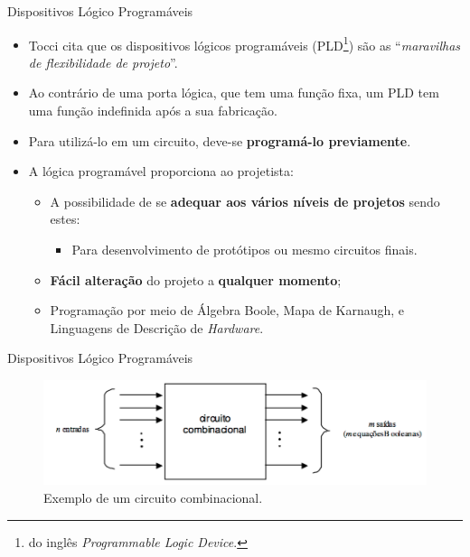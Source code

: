 \documentclass[aspectratio=169]{beamer}
\begin{document}
	\begin{frame}{Dispositivos Lógico Programáveis}
		\begin{itemize}
			\setlength\itemsep{1em}
			
			\item Tocci \cite{Tocci2003} cita que os dispositivos lógicos programáveis (PLD\footnote{do inglês \textit{Programmable Logic Device}.}) são as ``\textit{maravilhas de flexibilidade de projeto}''.
			
			\item Ao contrário de uma porta lógica, que tem uma função fixa, um PLD tem uma função indefinida após a sua fabricação. 
			
			\item Para utilizá-lo em um circuito, deve-se \textbf{programá-lo previamente}.
			
			\item A lógica programável proporciona ao projetista:
			\begin{itemize}
				\setlength\itemsep{0.3em}
				\item A possibilidade de se \textbf{adequar aos vários níveis de projetos} sendo estes:
				\begin{itemize}
					\item Para desenvolvimento de protótipos ou mesmo circuitos finais.
				\end{itemize}
				
				\item \textbf{Fácil alteração} do projeto a \textbf{qualquer momento};
				
				\item Programação por meio de Álgebra Boole, Mapa de Karnaugh, e Linguagens de Descrição de \textit{Hardware}.
			\end{itemize}
		\end{itemize}
	\end{frame}
	
	\begin{frame}{Dispositivos Lógico Programáveis}
		\begin{figure}[H]
			\centering
			\includegraphics[width=1\textwidth]{img/fpga/geral1.png}
			\caption{Exemplo de um circuito combinacional.}
		\end{figure}
	\end{frame}
	
\end{document}
